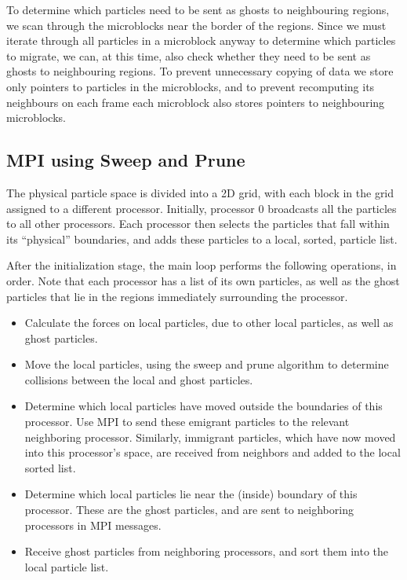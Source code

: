 \documentclass[11pt]{article} %
\begin{document}
To determine which particles need to be sent as ghosts to neighbouring regions, we scan through the microblocks near the border of the regions. Since we must iterate through all particles in a microblock anyway to determine which particles to migrate, we can, at this time, also check whether they need to be sent as ghosts to neighbouring regions. To prevent unnecessary copying of data we store only pointers to particles in the microblocks, and to prevent recomputing its neighbours on each frame each microblock also stores pointers to neighbouring microblocks.

\subsection{MPI using Sweep and Prune}

The physical particle space is divided into a 2D grid, with each block in the grid assigned to a different processor. Initially, processor 0 broadcasts all the particles to all other processors. Each processor then selects the particles that fall within its ``physical'' boundaries, and adds these particles to a local, sorted, particle list.

After the initialization stage, the main loop performs the following operations, in order. Note that each processor has a list of its own particles, as well as the ghost particles that lie in the regions immediately surrounding the processor.
\begin{itemize}
\item Calculate the forces on local particles, due to other local particles, as well as ghost particles.
\item Move the local particles, using the sweep and prune algorithm to determine collisions between the local and ghost particles.
\item Determine which local particles have moved outside the boundaries of this processor. Use MPI to send these emigrant particles to the relevant neighboring processor. Similarly, immigrant particles, which have now moved into this processor's space, are received from neighbors and added to the local sorted list.
\item Determine which local particles lie near the (inside) boundary of this processor. These are the ghost particles, and are sent to neighboring processors in MPI messages.
\item Receive ghost particles from neighboring processors, and sort them into the local particle list.
\end{itemize}
\end{document}
